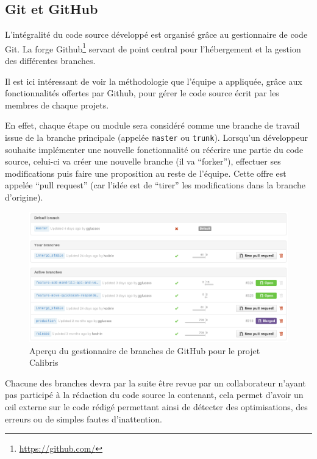\documentclass[12pt,a4paper]{book}
\begin{document}
\subsection{Git et GitHub}

\label{sec.git}

L'intégralité du code source développé est organisé grâce au gestionnaire de code Git. La forge Github\footnote{\url{https://github.com/}} servant de point central pour l'hébergement et la gestion des différentes branches.

Il est ici intéressant de voir la méthodologie que l'équipe a appliquée, grâce aux fonctionnalités offertes par Github, pour gérer le code source écrit par les membres de chaque projets.

En effet, chaque étape ou module sera considéré comme une branche de travail issue de la branche principale (appelée \texttt{master} ou \texttt{trunk}). Lorsqu'un développeur souhaite implémenter une nouvelle fonctionnalité ou réécrire une partie du code source, celui-ci va créer une nouvelle branche (il va ``forker''), effectuer ses modifications puis faire une proposition au reste de l'équipe. Cette offre est appelée ``pull request'' (car l'idée est de ``tirer'' les modifications dans la branche d'origine).

\begin{figure}[htp]
\centering
\includegraphics[scale=.50]{img/branches.png}
 \caption{Aperçu du gestionnaire de branches de GitHub pour le projet Calibris}
 \label{fig.github}
\end{figure}

Chacune des branches devra par la suite être revue par un collaborateur n'ayant pas participé à la rédaction du code source la contenant, cela permet d'avoir un œil externe sur le code rédigé permettant ainsi de détecter des optimisations, des erreurs ou de simples fautes d'inattention.
\end{document}
